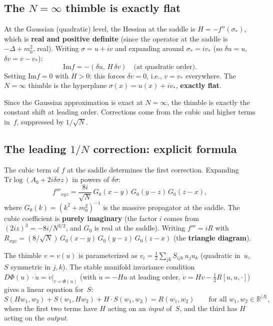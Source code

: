 \documentclass[12pt]{article}
\theoremstyle{definition}
\theoremstyle{remark}
\newcommand{\R}{\mathbb{R}}
\newcommand{\Tr}{\mathrm{Tr}}
\newcommand{\La}{\Lambda}
\newcommand{\im}{\mathrm{Im}}
\begin{document}
\subsection{The $N = \infty$ thimble is exactly flat}

At the Gaussian (quadratic) level, the Hessian at the saddle is
$H = -f''(\sigma_*)$, which is \textbf{real and positive definite}
(since the operator at the saddle is $-\Delta + m_0^2$, real).
Writing $\sigma = u + iv$ and expanding around $\sigma_* = iv_*$
(so $\delta u = u$, $\delta v = v - v_*$):
\begin{equation}
  \im f = -(\delta u,\, H\,\delta v) \quad\text{(at quadratic order)}.
\end{equation}
Setting $\im f = 0$ with $H > 0$: this forces $\delta v = 0$,
i.e., $v = v_*$ everywhere.
The $N = \infty$ thimble is the hyperplane
$\sigma(x) = u(x) + iv_*$, \textbf{exactly flat}.

Since the Gaussian approximation is exact at $N = \infty$, the
thimble is exactly the constant shift at leading order. Corrections
come from the cubic and higher terms in~$f$, suppressed by
$1/\sqrt{N}$.

\subsection{The leading $1/N$ correction: explicit formula}
\label{sec:1N_correction}

The cubic term of $f$ at the saddle determines the first correction.
Expanding $\Tr\log(A_0 + 2i\delta\sigma z)$ in powers of
$\delta\sigma$:
\begin{equation}
  f'''_{xyz} = \frac{8i}{\sqrt{N}}\,G_0(x-y)\,G_0(y-z)\,G_0(z-x),
\end{equation}
where $G_0(k) = (k^2 + m_0^2)^{-1}$ is the massive propagator at
the saddle. The cubic coefficient is \textbf{purely imaginary}
(the factor $i$ comes from $(2iz)^3 = -8i/N^{3/2}$, and $G_0$ is
real at the saddle). Writing $f''' = iR$ with
$R_{xyz} = (8/\sqrt{N})\,G_0(x{-}y)\,G_0(y{-}z)\,G_0(z{-}x)$
(the \textbf{triangle diagram}).

The thimble $v = v(u)$ is parameterized as $v_i = \tfrac{1}{2}
\sum_{jk} S_{ijk}\,u_j u_k$ (quadratic in~$u$, $S$ symmetric in
$j,k$). The stable manifold invariance condition
$D\Phi(u)\cdot\dot{u} = \dot{v}|_{v=\Phi(u)}$ (with
$\dot{u} = -Hu$ at leading order, $\dot{v} = Hv - \tfrac{1}{2}R[u,u,\cdot]$)
gives a linear equation for~$S$:
\begin{equation}\label{eq:stable_manifold}
  S(Hw_1, w_2) + S(w_1, Hw_2) + H\cdot S(w_1, w_2) = R(w_1, w_2)
  \qquad \text{for all } w_1, w_2 \in \R^{|\La|},
\end{equation}
where the first two terms have $H$ acting on an \emph{input} of~$S$,
and the third has $H$ acting on the \emph{output}.
\end{document}
